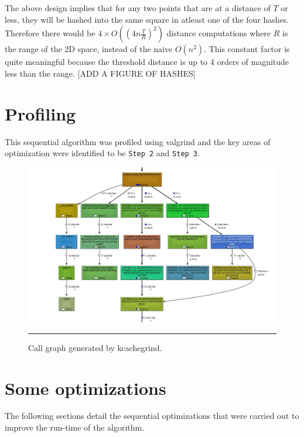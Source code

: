     The above design implies that for any two points that are at a distance of \begin{math} T \end{math} or less, they will be hashed into the same square in atleast one of the four hashes. Therefore there would be \begin{math} {4\times{O({(4n{\frac{T}{R}})}^2)}} \end{math} distance computations where \begin{math} R \end{math} is the range of the 2D space, instead of the naive \begin{math} {O(n^2)} \end{math}. This constant factor is quite meaningful because the threshold distance is up to 4 orders of magnitude less than the range.
[ADD A FIGURE OF HASHES]
\section{Profiling}
This sequential algorithm was profiled using valgrind and the key areas of optimization were identified to be \texttt{Step 2} and \texttt{Step 3}.
\begin{figure}%
    \includegraphics[scale=0.4]{Pictures/profile.png}
		\rule{40em}{0.5pt}
    \caption[Profiling]{Call graph generated by kcachegrind.}
	\label{fig:profile}
\end{figure}

\section{Some optimizations}
The following sections detail the sequential optimizations that were carried out to improve the run-time of the algorithm.
